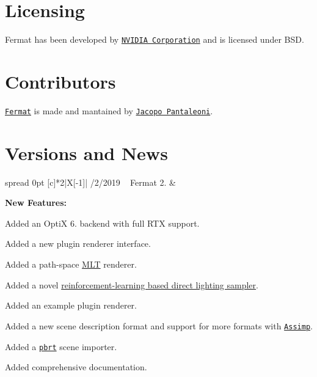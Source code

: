 \hypertarget{index_Licensing}{}\section{Licensing}\label{index_Licensing}
\begin{DoxyParagraph}{}
Fermat has been developed by \href{www.nvidia.com}{\tt N\+V\+I\+D\+IA Corporation} and is licensed under B\+SD.
\end{DoxyParagraph}
\hypertarget{index_Contributors}{}\section{Contributors}\label{index_Contributors}
\begin{DoxyParagraph}{}
\href{https://github.com/NVlabs/fermat}{\tt Fermat} is made and mantained by \href{jpantaleoni@nvidia.com}{\tt Jacopo Pantaleoni}.
\end{DoxyParagraph}
\hypertarget{index_NewsSection}{}\section{Versions and News}\label{index_NewsSection}
\begin{DoxyParagraph}{}
\tabulinesep=1mm
\begin{longtabu} spread 0pt [c]{*{2}{|X[-1]}|}
/2/2019 ~\newline
 Fermat 2. &
\begin{DoxyItemize}
\item {\bfseries New Features\+:} ~\newline

\begin{DoxyItemize}
\item Added an OptiX 6. backend with full R\+TX support.
\item Added a new plugin renderer interface.
\item Added a path-\/space \hyperlink{struct_m_l_t}{M\+LT} renderer.
\item Added a novel \hyperlink{struct_direct_lighting_r_l}{reinforcement-\/learning based direct lighting sampler}.
\item Added an example plugin renderer.
\item Added a new scene description format and support for more formats with \href{http://assimp.org/}{\tt Assimp}.
\item Added a \href{https://www.pbrt.org/fileformat-v3.html}{\tt pbrt} scene importer.
\item Added comprehensive documentation.  
\end{DoxyItemize}
\end{DoxyItemize}\\
\end{longtabu}

\end{DoxyParagraph}
